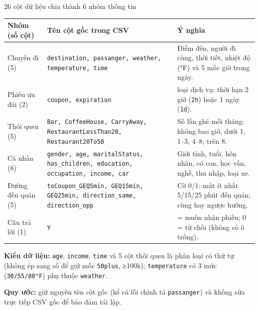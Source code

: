 \documentclass[aspectratio=169,12pt]{beamer}
\newcommand{\SlideOwner}{}
\newcommand{\Owner}[1]{\renewcommand{\SlideOwner}{#1}}
\newcommand{\Point}[1]{#1\par\vspace{2mm}}
\begin{document}
\Owner{Nguyễn Mạnh Hà}
\begin{frame}[t]{26 cột dữ liệu chia thành 6 nhóm thông tin}
  \vspace{2mm}
  {\fontsize{13.8}{18.5}\selectfont\renewcommand{\arraystretch}{1.28}
  \begin{tabular}{@{}>{\raggedright\arraybackslash}p{51mm}
    >{\raggedright\arraybackslash\hyphenpenalty=10000}p{155mm}
    >{\raggedright\arraybackslash}p{95mm}@{}}
    \toprule
    \textbf{Nhóm (số cột)} & \textbf{Tên cột gốc trong CSV} & \textbf{Ý nghĩa}\\ \midrule
    Chuyến đi (5) & \texttt{destination, passanger, weather, temperature, time} & Điểm đến, người đi cùng, thời tiết, nhiệt độ (°F) và 5 mốc giờ trong ngày.\\[2.5mm]
    Phiếu ưu đãi (2) & \texttt{coupon, expiration} & 5 loại dịch vụ; thời hạn 2 giờ (\texttt{2h}) hoặc 1 ngày (\texttt{1d}).\\[2.5mm]
    Thói quen (5) & \texttt{Bar, CoffeeHouse, CarryAway, RestaurantLessThan20, Restaurant20To50} & Số lần ghé mỗi tháng: không bao giờ, dưới 1, 1–3, 4–8, trên 8.\\[2.5mm]
    Cá nhân (8) & \texttt{gender, age, maritalStatus, has\_children, education, occupation, income, car} & Giới tính, tuổi, hôn nhân, có con, học vấn, nghề, thu nhập, loại xe.\\[2.5mm]
    Đường đến quán (5) & \texttt{toCoupon\_GEQ5min, GEQ15min, GEQ25min, direction\_same, direction\_opp} & Cờ 0/1: mất ít nhất 5/15/25 phút đến quán; cùng hay ngược hướng.\\[2.5mm]
    Câu trả lời (1) & \texttt{Y} & 1 = muốn nhận phiếu; 0 = từ chối (không có ô trống).\\
    \bottomrule
  \end{tabular}}\par
  \vspace{5mm}
  {\fontsize{13}{18}\selectfont\color{Muted}
  \Point{\textbf{Kiểu dữ liệu:} \texttt{age}, \texttt{income}, \texttt{time} và 5 cột thói quen là phân loại có thứ tự (không ép sang số để giữ mốc \texttt{50plus}, ≥100k); \texttt{temperature} có 3 mức (\texttt{30/55/80°F}) phụ thuộc \texttt{weather}.}
  \textbf{Quy ước:} giữ nguyên tên cột gốc (kể cả lỗi chính tả \texttt{passanger}) và không sửa trực tiếp CSV gốc để bảo đảm tái lập.}
\end{frame}
\end{document}
